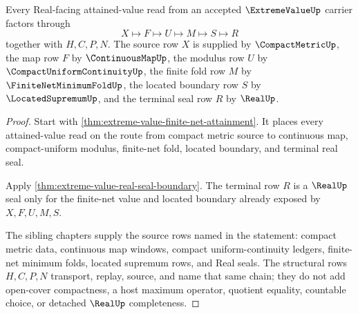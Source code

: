 \begin{theorem}
\label{thm:extreme-value-real-seal-factorization}
Every Real-facing attained-value read from an accepted $\ExtremeValueUp$ carrier factors through
$$
X\longmapsto F\longmapsto U\longmapsto M\longmapsto S\longmapsto R
$$
together with $H,C,P,N$. The source row $X$ is supplied by $\CompactMetricUp$, the map row $F$ by $\ContinuousMapUp$, the modulus row $U$ by $\CompactUniformContinuityUp$, the finite fold row $M$ by $\FiniteNetMinimumFoldUp$, the located boundary row $S$ by $\LocatedSupremumUp$, and the terminal seal row $R$ by $\RealUp$.
\end{theorem}
\begin{proof}
Start with \autoref{thm:extreme-value-finite-net-attainment}. It places every attained-value read on the route from compact metric source to continuous map, compact-uniform modulus, finite-net fold, located boundary, and terminal real seal.

Apply \autoref{thm:extreme-value-real-seal-boundary}. The terminal row $R$ is a $\RealUp$ seal only for the finite-net value and located boundary already exposed by $X,F,U,M,S$.

The sibling chapters supply the source rows named in the statement: compact metric data, continuous map windows, compact uniform-continuity ledgers, finite-net minimum folds, located supremum rows, and Real seals. The structural rows $H,C,P,N$ transport, replay, source, and name that same chain; they do not add open-cover compactness, a host maximum operator, quotient equality, countable choice, or detached $\RealUp$ completeness.
\end{proof}

